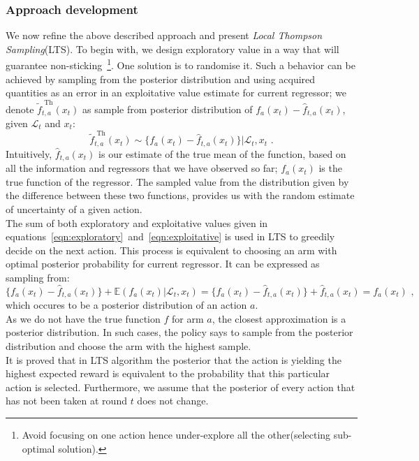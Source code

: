 \documentclass[12pt, a4paper, pdflatex, leqno, twoside]{report}
\begin{document}
\subsubsection{Approach development}
We now refine the above described approach and present \emph{Local Thompson 
Sampling}(LTS). To begin with, we design exploratory value in a way that will 
guarantee non-sticking~\footnote{Avoid focusing on one action hence under-explore all the other(selecting sub-optimal solution).}. One solution is to randomise it. 
Such a behavior can be achieved by sampling from the posterior distribution and 
using acquired quantities as an error in an exploitative value estimate for 
current regressor; we denote $\tilde{f}_{t,a}^{\text{ Th}} (x_t)$ as sample from 
posterior distribution of $f_a(x_t) - \hat{f}_{t,a}(x_t)$, given 
$\mathscr{L}_t$ and $x_t$:
\begin{equation}
  \label{eqn:exploratory} \tilde{f}_{t,a}^{\text{ Th}} (x_t) \sim \{ f_a(x_t) - 
\hat{f}_{t,a}(x_t) \} | \mathscr{L}_t,x_t \text{ .}
\end{equation}
Intuitively, $\hat{f}_{t,a}(x_t)$ is our estimate of the true mean of the function, 
based on all the information and regressors that we have observed so far; $f_a(x_t)$ 
is the true function of the regressor. The sampled value from the distribution 
given by the difference between these two functions, provides us with the random estimate of 
uncertainty of a given action.\\

The sum of both exploratory and exploitative values given in 
equations~\ref{eqn:exploratory}~and~\ref{eqn:exploitative} is used in LTS to 
greedily decide on the next action. This process is equivalent to choosing an 
arm with optimal posterior probability for current regressor. It can be 
expressed as sampling from:
$$
\{ f_a(x_t) - \hat{f}_{t,a}(x_t) \} +  \mathbb{E} ( f_a(x_t) | \mathscr{L}_t, 
x_t )
=
 \{ f_a(x_t) - \hat{f}_{t,a}(x_t) \}+ \hat{f}_{t,a} (x_t)
 =
 f_a(x_t) \text{ ,}
$$
which occures to be a posterior distribution of an action $a$.\\
As we do not have the true function $f$ for arm $a$, the closest approximation 
is a posterior distribution. In such cases, the policy says to sample from the 
posterior distribution and choose the arm with the highest sample.\\
It is proved that in LTS algorithm the posterior that the action is yielding the highest expected reward is equivalent to the probability that this particular action is selected. 
Furthermore, we assume that the posterior of every action that has not been taken 
at round $t$ does not change.\\
\end{document}
